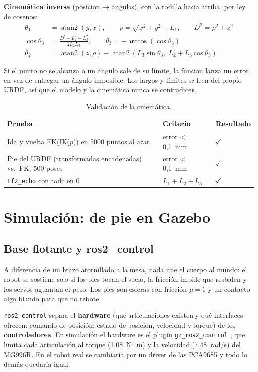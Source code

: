 \documentclass[11pt,a4paper]{article}
\newcommand{\ok}{\textcolor{Verde}{$\checkmark$}}
\newcommand{\seccion}[1]{\Needspace{18\baselineskip}\section{#1}}
\newcommand{\subsec}[1]{\Needspace{9\baselineskip}\subsection{#1}}
\begin{document}
\textbf{Cinemática inversa} (posición → ángulos), con la rodilla hacia arriba,
por ley de cosenos:
\begin{align}
\theta_1 &= \operatorname{atan2}(y, x),\qquad \rho = \sqrt{x^2+y^2}-L_1,\qquad D^2=\rho^2+z^2\\
\cos\theta_3 &= \frac{D^2 - L_2^2 - L_3^2}{2L_2L_3},\qquad \theta_3 = -\arccos(\cos\theta_3)\\
\theta_2 &= \operatorname{atan2}(z,\rho) - \operatorname{atan2}\!\left(L_3\sin\theta_3,\; L_2 + L_3\cos\theta_3\right)
\end{align}

Si el punto no se alcanza o un ángulo sale de su límite, la función lanza un
error en vez de entregar un ángulo imposible. Los largos y límites se leen
del propio URDF, así que el modelo y la cinemática nunca se contradicen.

\begin{table}[H]\centering\small
\caption{Validación de la cinemática.}\label{tab:cinematica}
\begin{tabularx}{\linewidth}{@{}YYl@{}}
\toprule
\textbf{Prueba} & \textbf{Criterio} & \textbf{Resultado}\\\midrule
Ida y vuelta FK(IK($p$)) en 5000 puntos al azar & error < 0,1~mm & \ok\\
Pie del URDF (transformadas encadenadas) vs.\ FK, 500 poses & error < 0,1~mm & \ok\\
\texttt{tf2\_echo} con todo en 0 & $L_1+L_2+L_3$ & \ok\\
\bottomrule
\end{tabularx}
\end{table}

\seccion{Simulación: de pie en Gazebo}

\subsec{Base flotante y ros2\_control}

A diferencia de un brazo atornillado a la mesa, nada une el cuerpo al
mundo: el robot se sostiene solo si los pies tocan el suelo, la fricción
impide que resbalen y los servos aguantan el peso. Los pies son esferas con
fricción $\mu = 1$ y un contacto algo blando para que no rebote.

\texttt{ros2\_control} \cite{ros2control} separa el \textbf{hardware} (qué
articulaciones existen y qué interfaces ofrecen: comando de posición;
estado de posición, velocidad y torque) de los \textbf{controladores}. En
simulación el hardware es el plugin \texttt{gz\_ros2\_control}
\cite{gzros2control}, que limita cada articulación al torque (1,08~N·m) y la
velocidad (7,48~rad/s) del MG996R. En el robot real se cambiaría por un
driver de las PCA9685 y todo lo demás quedaría igual.
\end{document}
